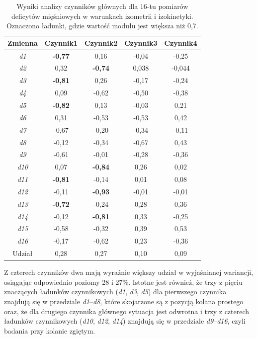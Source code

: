\begin{table}[h]
	\centering
	\setlength{\tabcolsep}{3pt}
	\setlength\extrarowheight{2pt}
	\caption{Wyniki analizy czynników głównych dla 16-tu pomiarów deficytów mięśniowych w warunkach izometrii i izokinetyki. Oznaczono ładunki, gdzie wartość modułu jest większa niż 0,7.}
	\label{tab:pca-muscles}
	\begin{tabular}{c|c|c|c|c}

		Zmienna&Czynnik1&Czynnik2&Czynnik3&Czynnik4 \\
		\hline \hline
		\textit{d1}&\textbf{-0,77}&0,16&-0,04&-0,25 \\
		\hline
		\textit{d2}&0,32&\textbf{-0,74}&0,038&-0,044 \\
		\hline
		\textit{d3}&\textbf{-0,81}&0,26&-0,17&-0,24 \\
		\hline
		\textit{d4}&0,09&-0,62&-0,50&-0,38 \\
		\hline
		\textit{d5}&\textbf{-0,82}&0,13&-0,03&0,21 \\
		\hline
		\textit{d6}&0,31&-0,53&-0,53&0,42 \\
		\hline
		\textit{d7}&-0,67&-0,20&-0,34&-0,11 \\
		\hline
		\textit{d8}&-0,12&-0,34&-0,67&0,43 \\
		\hline
		\textit{d9}&-0,61&-0,01&-0,28&-0,36 \\
		\hline
		\textit{d10}&0,07&\textbf{-0,84}&0,26&0,02 \\
		\hline
		\textit{d11}&\textbf{-0,81}&-0,14&0,01&0,08 \\
		\hline
		\textit{d12}&-0,11&\textbf{-0,93}&-0,01&-0,01 \\
		\hline
		\textit{d13}&\textbf{-0,72}&-0,24&0,28&0,36 \\
		\hline
		\textit{d14}&-0,12&\textbf{-0,81}&0,33&-0,25 \\
		\hline
		\textit{d15}&-0,58&-0,32&0,39&0,53 \\
		\hline
		\textit{d16}&-0,17&-0,62&0,23&-0,36 \\
		\hline\hline
		Udział&0,28&0,27&0,10&0,09 \\

	\end{tabular}
\end{table}

Z czterech czynników dwa mają wyraźnie większy udział w wyjaśnianej wariancji, osiągając odpowiednio poziomy 28 i 27\%. Istotne jest również, że trzy z pięciu znaczących ładunków czynnikowych (\textit{d1}, \textit{d3}, \textit{d5}) dla pierwszego czynnika znajdują się w przedziale \textit{d1}--\textit{d8}, które skojarzone są z pozycją kolana prostego oraz, że dla drugiego czynnika głównego sytuacja jest odwrotna i trzy z czterech ładunków czynnikowych (\textit{d10}, \textit{d12}, \textit{d14}) znajdują się w przedziale \textit{d9}--\textit{d16}, czyli badania przy kolanie zgiętym. 

